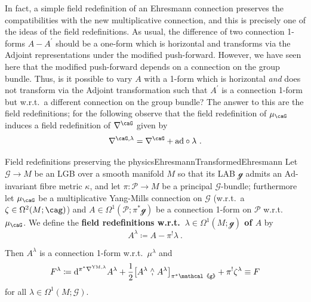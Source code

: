 \documentclass[reqno,a4paper,oneside]{amsart}
\newcommand\mutot{\mu_\caG}
\theoremstyle{plain}
\theoremstyle{remark}
\theoremstyle{definition}
\begin{document}
In fact, a simple field redefinition of an Ehresmann connection preserves the compatibilities with the new multiplicative connection, and this is precisely one of the ideas of the field redefinitions. As usual, the difference of two connection 1-forms $A - A^\prime$ should be a one-form which is horizontal and transforms via the Adjoint representations under the modified push-forward. However, we have seen here that the modified push-forward depends on a connection on the group bundle. Thus, is it possible to vary $A$ with a 1-form which is horizontal \textit{and} does not transform via the Adjoint transformation such that $A^\prime$ is a connection 1-form but w.r.t.\ a different connection on the group bundle? The answer to this are the field redefinitions; for the following observe that the field redefinition of $\mutot$ induces a field redefinition of $\nabla^\caG$ given by
\begin{equation*}
\nabla^{\caG, \lambda}
=
\nabla^\caG
	+ \mathrm{ad} \circ \lambda ~ .
\end{equation*}

\begin{theorems}{Field redefinitions preserving the physics}{EhresmannTransformedEhresmann}
Let $\mathcal{G} \to M$ be an LGB over a smooth manifold $M$ so that its LAB $\mathcal{g}$ admits an $\mathrm{Ad}$-invariant fibre metric $\kappa$, and let $\pi\colon\mathcal{P} \to M$ be a principal $\mathcal{G}$-bundle; furthermore let $\mutot$ be a multiplicative Yang-Mills connection on $\mathcal{G}$ (w.r.t.\ a $\zeta \in \Omega^2(M; \cag)$) and $A \in \Omega^1(\mathcal{P}; \pi^*\mathcal{g})$ be a connection 1-form on $\mathcal{P}$ w.r.t.\ $\mutot$. We define the \textbf{field redefinitions w.r.t.\ $\lambda \in \Omega^1(M; \mathcal{g})$ of $A$} by
\begin{equation*}
A^\lambda
\coloneqq
A - \pi^!\lambda ~.
\end{equation*}

Then $A^\lambda$ is a connection 1-form w.r.t.\ $\mu^{\lambda}$ and
\begin{equation*}
F^\lambda
\coloneqq
\mathrm{d}^{\pi^*\nabla^{\mathrm{YM},\lambda}} A^\lambda
	+ \frac{1}{2} \mleft[ A^\lambda \stackrel{\wedge}{,} A^\lambda \mright]_{\pi^*\mathcal{g}}
	+ \pi^!\zeta^\lambda
\equiv
F
\end{equation*}
for all $\lambda \in \Omega^1(M; \mathcal{G})$. 
\end{theorems}
\end{document}
